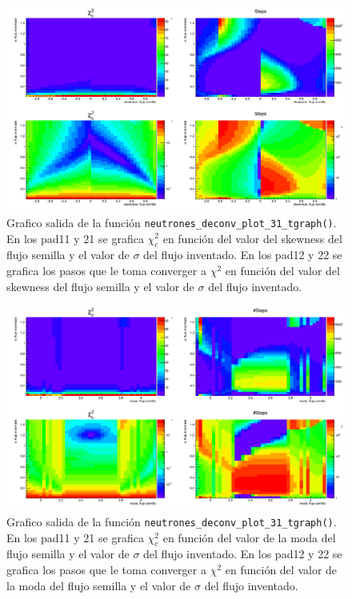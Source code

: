 \documentclass[11pt,letterpaper]{article}
\begin{document}
 \begin{figure}[H]
    \includegraphics[width=1.\textwidth]{img/plot_deconv_31_tgraph_1.png}
    \centering
     \cprotect\caption{Grafico salida de la función \verb|neutrones_deconv_plot_31_tgraph()|. En los pad11 y 21 se grafica $\chi_c^2$ en función del valor del skewness del flujo semilla y el valor de $\sigma$ del flujo inventado.  En los pad12 y 22 se grafica los pasos que le toma converger a $\chi^2$  en función del valor del skewness del flujo semilla y el valor de $\sigma$ del flujo inventado.} 
\label{plot_deconv_31_tgraph_skewness}
\end{figure}

 \begin{figure}[H]
    \includegraphics[width=1.\textwidth]{img/plot_deconv_31_tgraph_2.png}
    \centering
     \cprotect\caption{Grafico salida de la función \verb|neutrones_deconv_plot_31_tgraph()|. En los pad11 y 21 se grafica $\chi_c^2$ en función del valor de la moda del flujo semilla y el valor de $\sigma$ del flujo inventado.  En los pad12 y 22 se grafica los pasos que le toma converger a $\chi^2$  en función del valor de la moda del flujo semilla y el valor de $\sigma$ del flujo inventado.} 
\label{plot_deconv_31_tgraph_moda}
\end{figure}
\end{document}
